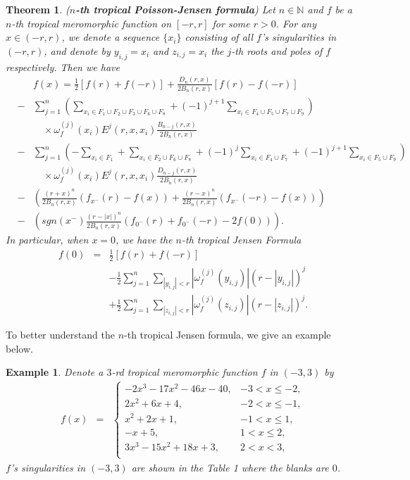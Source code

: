 \documentclass{article}
\newtheorem{theorem}[defin]{Theorem}
\newtheorem{exa}[defin]{Example}
\begin{document}
\begin{theorem}\label{theorem3.3}
    (\textbf{$n$-th tropical Poisson-Jensen formula}) Let $n\in\mathbb{N}$ and $f$ be a $n$-th tropical meromorphic function on $[-r, r]$ for some $r>0$. For any $x\in (-r, r)$, we denote a sequence $\{x_{i}\}$ consisting of all $f$'s singularities in $(-r, r)$, and denote by $y_{i, j}=x_{i}$ and $z_{i, j}=x_{i}$ the $j$-th roots and poles of $f$ respectively. Then we have
    \begin{eqnarray}\label{3pj}
    &&f(x)=\frac{1}{2}[f(r)+f(-r)]+\frac{D_{n}(r, x)}{2B_{n}(r, x)}[f(r)-f(-r)]\nonumber\\
    &-&\sum_{j=1}^{n}\left(\sum_{x_{i}\in F_{1}\cup F_{2}\cup F_{3}\cup F_{6}\cup F_{8}}+(-1)^{j+1}\sum_{x_{i}\in F_{4}\cup F_{5}\cup F_{7}\cup F_{9}}\right)\nonumber\\
    &&\quad \times\omega_{f}^{(j)}(x_{i})E^{j}(r, x, x_{i})\frac{B_{n-j}(r, x)}{2B_{n}(r, x)}\nonumber\\
    &-&\sum_{j=1}^{n}\left(-\sum_{x_{i}\in F_{1}}+\sum_{x_{i}\in F_{2} \cup F_{6} \cup F_{8}}+(-1)^{j}\sum_{x_{i}\in F_{4}\cup F_{7}}+(-1)^{j+1}\sum_{x_{i}\in F_{5}\cup F_{9}}\right)\nonumber\\
    &&\quad \times\omega_{f}^{(j)}(x_{i})E^{j}(r, x, x_{i})\frac{D_{n-j}(r, x)}{2B_{n}(r, x)}\nonumber\\
    &-&\left(\frac{(r+x)^{n}}{2B_{n}(r, x)}(f_{x^{-}}(r)-f(x))+\frac{(r-x)^{n}}{2B_{n}(r, x)}(f_{x^{-}}(-r)-f(x))\right)\nonumber\\
    &-&\left(sgn(x^{-})\frac{(r-|x|)^{n}}{2B_{n}(r, x)}(f_{0^{-}}(r)+f_{0^{-}}(-r)-2f(0))\right).
\end{eqnarray}
  In particular, when $x=0$, we have the 
$n$-th tropical Jensen Formula
\begin{eqnarray}\label{3j}
    f(0)&=&\frac{1}{2}[f(r)+f(-r)]\nonumber\\
    &&-\frac{1}{2}\sum_{j=1}^{n}\sum_{|y_{i, j}|<r}|\omega_{f}^{(j)}(y_{i, j})|(r-|y_{i,j}|)^{j}\nonumber\\
    &&+\frac{1}{2}\sum_{j=1}^{n}\sum_{|z_{i, j}|<r}|\omega_{f}^{(j)}(z_{i, j})|(r-|z_{i, j}|)^{j}.
\end{eqnarray}
\end{theorem}
 To better understand the $n$-th tropical Jensen formula, we give an example below.
 \begin{exa}
     Denote a $3$-rd tropical meromorphic function $f$ in $(-3, 3)$ by
     \begin{eqnarray*}
        f(x)&=& \left\{\begin{array}{ll}
         -2x^{3}-17x^{2}-46x-40, & -3<x\leq -2,\\
         2x^{2}+6x+4, & -2<x\leq -1,\\
         x^{2}+2x+1, & -1<x\leq 1,\\
         -x+5, & 1<x\leq 2,\\
         3x^{3}-15x^{2}+18x+3, & 2<x< 3,\\
         \end{array}\right.
    \end{eqnarray*}
    $f$'s singularities in $(-3, 3)$ are shown in the Table 1 where the blanks are $0$.
    \end{exa}
\end{document}
